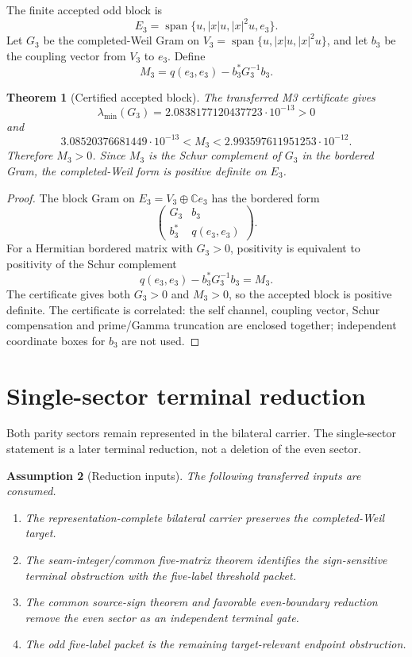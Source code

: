 \documentclass[11pt]{article}
\newtheorem{theorem}{Theorem}[section]
\newtheorem{assumption}[theorem]{Assumption}
\newcommand{\C}{\mathbb C}
\begin{document}
The finite accepted odd block is
\[
E_3=\operatorname{span}\{u, |x|u, |x|^2u, e_3\}.
\]
Let \(G_3\) be the completed-Weil Gram on \(V_3=\operatorname{span}\{u,|x|u,|x|^2u\}\), and let \(b_3\) be the coupling vector from \(V_3\) to \(e_3\).  Define
\[
M_3=q(e_3,e_3)-b_3^*G_3^{-1}b_3.
\]

\begin{theorem}[Certified accepted block]
The transferred M3 certificate gives
\[
\lambda_{\min}(G_3)=2.0838177120437723\cdot10^{-13}>0
\]
and
\[
3.08520376681449\cdot10^{-13}<M_3<2.993597611951253\cdot10^{-12}.
\]
Therefore \(M_3>0\).  Since \(M_3\) is the Schur complement of \(G_3\) in the bordered Gram, the completed-Weil form is positive definite on \(E_3\).
\end{theorem}

\begin{proof}
The block Gram on \(E_3=V_3\oplus\C e_3\) has the bordered form
\[
\begin{pmatrix}
G_3 & b_3\\
b_3^* & q(e_3,e_3)
\end{pmatrix}.
\]
For a Hermitian bordered matrix with \(G_3>0\), positivity is equivalent to positivity of the Schur complement
\[
q(e_3,e_3)-b_3^*G_3^{-1}b_3=M_3.
\]
The certificate gives both \(G_3>0\) and \(M_3>0\), so the accepted block is positive definite.  The certificate is correlated: the self channel, coupling vector, Schur compensation and prime/Gamma truncation are enclosed together; independent coordinate boxes for \(b_3\) are not used.
\end{proof}

\section{Single-sector terminal reduction}

Both parity sectors remain represented in the bilateral carrier.  The single-sector statement is a later terminal reduction, not a deletion of the even sector.

\begin{assumption}[Reduction inputs]
The following transferred inputs are consumed.
\begin{enumerate}[label=(\roman*)]
\item The representation-complete bilateral carrier preserves the completed-Weil target.
\item The seam-integer/common five-matrix theorem identifies the sign-sensitive terminal obstruction with the five-label threshold packet.
\item The common source-sign theorem and favorable even-boundary reduction remove the even sector as an independent terminal gate.
\item The odd five-label packet is the remaining target-relevant endpoint obstruction.
\end{enumerate}
\end{assumption}
\end{document}
